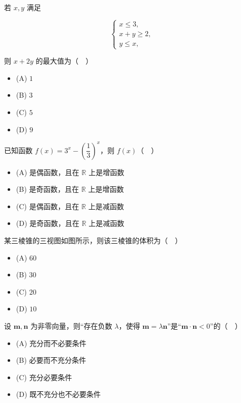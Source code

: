 \begingroup
\renewenvironment{question}{\Needspace{0.3\textheight}}{}
\begin{question}

若 $x,y$ 满足

\nopagebreak[4]
\[
\begin{cases}
x\leqslant3,\\
x+y\geqslant2,\\
y\leqslant x,
\end{cases}
\]

则 $x+2y$ 的最大值为（　）

\begin{itemize}
\item (A) $1$
\item (B) $3$
\item (C) $5$
\item (D) $9$
\end{itemize}

\end{question}
\endgroup
\begin{question}
已知函数 $f(x)=3^x-\left(\dfrac13\right)^x$，则 $f(x)$（　）

\begin{itemize}
\item (A) 是偶函数，且在 $\mathbb R$ 上是增函数
\item (B) 是奇函数，且在 $\mathbb R$ 上是增函数
\item (C) 是偶函数，且在 $\mathbb R$ 上是减函数
\item (D) 是奇函数，且在 $\mathbb R$ 上是减函数
\end{itemize}

\Needspace{0.4\textheight}
\end{question}
\begin{question}
某三棱锥的三视图如图所示，则该三棱锥的体积为（　）
\nopagebreak[4]
\begin{center}\end{center}
\nopagebreak[4]
\begin{itemize}
\item (A) $60$
\item (B) $30$
\item (C) $20$
\item (D) $10$
\end{itemize}

\end{question}
\begin{question}
设 $\boldsymbol m,\boldsymbol n$ 为非零向量，则“存在负数 $\lambda$，使得 $\boldsymbol m=\lambda\boldsymbol n$”是“$\boldsymbol m\cdot\boldsymbol n<0$”的（　）

\begin{itemize}
\item (A) 充分而不必要条件
\item (B) 必要而不充分条件
\item (C) 充分必要条件
\item (D) 既不充分也不必要条件
\end{itemize}

\end{question}
